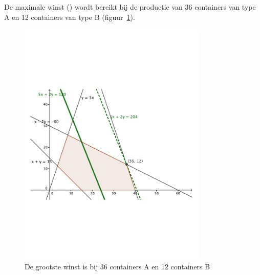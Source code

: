 \begin{Oplossing}{4.8}
    De maximale winst () wordt bereikt bij de productie van 36 containers van type A en 12 containers van type B (figuur~\ref{fig:containersAB}).
            \begin{figure}[hbtp]
\centering
\includegraphics[width=0.8\textwidth]{oefeningen/FigurenLP/OefcontainersAB.pdf}
\caption{De grootste winst is bij 36 containers A en 12 containers B}
\label{fig:containersAB}
\end{figure}
    
\end{Oplossing}
